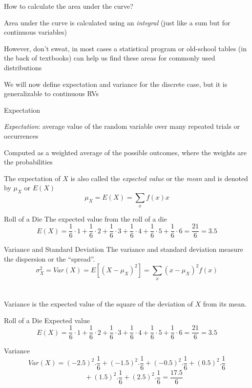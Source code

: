 \documentclass{./../div_teaching_slides}
\begin{document}
\begin{frame}{How to calculate the area under the curve?}
\begin{witemize}
  \item Area under the curve is calculated using an \textit{integral} (just like a sum but for continuous variables)
  \item However, don't sweat, in most cases a statistical program or old-school tables (in the back of textbooks) can help us find these areas for commonly used distributions
  \item We will now define expectation and variance for the discrete case, but it is generalizable to continuous RVs
\end{witemize}
\end{frame}


\begin{frame}{Expectation}
\begin{witemize}
  \item \textit{Expectation}: average value of the random variable over many repeated trials or occurrences
  \item Computed as a weighted average of the possible outcomes, where the weights are the probabilities
  \item The expectation of $X$ is also called the \textit{expected value} or the \textit{mean} and is denoted by $\mu_X$ or $E(X)$
  $$ \mu_X = E(X) = \sum_x f(x) x $$
  \end{witemize}
\end{frame}

\begin{frame}{Roll of a Die}
The expected value from the roll of a die
$$ E(X) = \frac{1}{6} \cdot 1 +  \frac{1}{6} \cdot 2 +  \frac{1}{6} \cdot 3 +  \frac{1}{6} \cdot 4 +  \frac{1}{6} \cdot 5 +  \frac{1}{6} \cdot 6 =\frac{21}{6} = 3.5 $$
\end{frame}

\begin{frame}{Variance and Standard Deviation}
The variance and standard deviation measure the dispersion or the ``spread''. \\
$$ \sigma^2_X =   Var(X) = E[(X-\mu_X)^2] =  \sum_{x} (x-\mu_X)^2 f(x) $$ \\~\\
Variance is the expected value of the square of the deviation of $X$ from its mean.
\end{frame}

\begin{frame}{Roll of a Die}
Expected value 
$$ E(X) = \frac{1}{6} \cdot 1 +  \frac{1}{6} \cdot 2 +  \frac{1}{6} \cdot 3 +  \frac{1}{6} \cdot 4 +  \frac{1}{6} \cdot 5 +  \frac{1}{6} \cdot 6 =\frac{21}{6} = 3.5 $$
\vspace{1em}

Variance
$$ Var(X) = (-2.5)^2.\frac{1}{6} + (-1.5)^2.\frac{1}{6} + (-0.5)^2.\frac{1}{6} + (0.5)^2.\frac{1}{6}  $$
$$ \quad \quad + (1.5)^2.\frac{1}{6}   + (2.5)^2.\frac{1}{6} = \frac{17.5}{6} $$ 
\end{frame}
\end{document}
